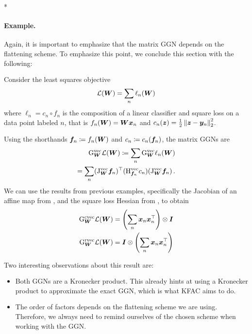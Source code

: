\switchcolumn[1]*
\switchcolumn[0]

\paragraph{Example.} Again, it is important to emphasize that the matrix GGN depends on the flattening scheme.
To emphasize this point, we conclude this section with the following:


\begin{example}
  Consider the least squares objective
  \begin{align*}
    {\mathcal{L}}({\bm{W}}) = \sum_n \ell_n({\bm{W}})
  \end{align*}
  where $\ell_n = c_n \circ f_n$ is the composition of a linear classifier and square loss
  on a data point labeled $n$, that is
  $f_n({\bm{W}}) = {\bm{W}} {\bm{x}}_n$ and $c_n({\bm{z}}) = \frac{1}{2}\left\lVert {\bm{z}} - {\bm{y}}_n \right\rVert^2_2$.

  Using the shorthands ${\bm{f}}_n \coloneq f_n({\bm{W}})$ and $c_n \coloneq c_n({\bm{f}}_n)$, the matrix GGNs are
  \begin{align*}
    \mathrm{G}_{{\bm{W}}}^{\operatorname{vec}}{\mathcal{L}}({\bm{W}})
    \coloneq
    \sum_n
    \mathrm{G}_{{\bm{W}}}^{\operatorname{vec}} \ell_n({\bm{W}})
    \\
    =
    \sum_n
    (\mathrm{J}^{\operatorname{vec}}_{{\bm{W}}} {\bm{f}}_n)^{\top}
    (\mathrm{H}^{\operatorname{vec}}_{{\bm{f}}_n} c_n)
    (\mathrm{J}^{\operatorname{vec}}_{{\bm{W}}} {\bm{f}}_n)\,.
  \end{align*}
  We can use the results from previous examples, specifically the Jacobian of an affine map from , and the square loss Hessian from , to obtain
  \begin{align*}
    \mathrm{G}_{{\bm{W}}}^{\operatorname{cvec}}{\mathcal{L}}({\bm{W}})
    & =
      \left(
      \sum_n {\bm{x}}_n {\bm{x}}_n^{\top}
      \right)
      \otimes {\bm{I}}
    \\
    \mathrm{G}_{{\bm{W}}}^{\operatorname{rvec}}{\mathcal{L}}({\bm{W}})
    & =
      {\bm{I}}
      \otimes
      \left(
      \sum_n {\bm{x}}_n {\bm{x}}_n^{\top}
      \right)
  \end{align*}
\end{example}
Two interesting observations about this result are:
\begin{itemize}
\item Both GGNs are a Kronecker product.
  This already hints at using a Kronecker product to approximate the exact GGN, which is what KFAC aims to do.

\item The order of factors depends on the flattening scheme we are using.
  Therefore, we always need to remind ourselves of the chosen scheme when working with the GGN.
\end{itemize}



